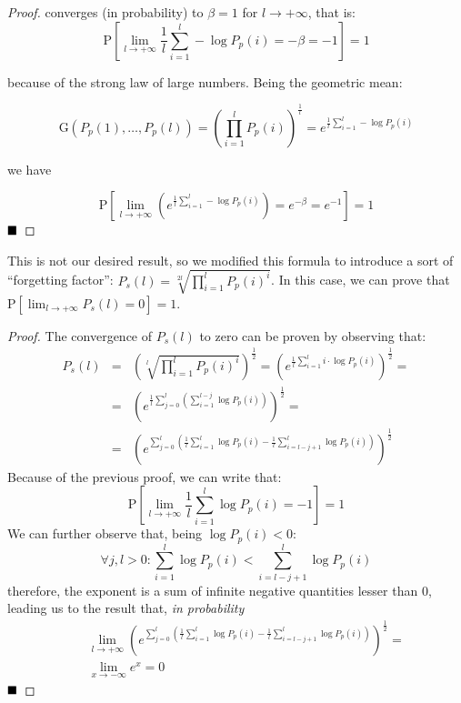 \begin{note}
\begin{proof}
  converges (in probability) to $\beta = 1$ for $l \to +\infty$, that is:
  \[
  \mathrm{P}\left[\lim_{l \to +\infty} \frac{1}{l}\sum_{i = 1}^{l} -\log P_{p}(i) = -\beta = -1 \right] = 1
  \]

  because of the strong law of large numbers. Being the geometric mean:

  \[
  \mathrm{G}(P_{p}(1), \ldots, P_{p}(l)) = \left(\prod_{i=1}^{l} P_{p}(i)\right)^{\frac{1}{l}} = e^{\frac{1}{l}\sum_{i = 1}^{l} -\log P_{p}(i)}
  \]

  we have

  \[
  \mathrm{P}\left[\lim_{l \to +\infty} \left( e^{\frac{1}{l}\sum_{i = 1}^{l} -\log P_{p}(i)} \right) = e^{-\beta} = e^{-1} \right] = 1
  \]
  \hfill$\qed$
\end{proof}

This is not our desired result, so we modified this formula to introduce a sort of ``forgetting factor'': $P_{s}(l) = \sqrt[2l]{\prod_{i = 1}^{l} P_{p}(i)^{i}}$. In this case, we can prove that $\mathrm{P}\left[\lim_{l \to +\infty} P_{s}(l) = 0\right] = 1$.

\begin{proof}
  The convergence of $P_{s}(l)$ to zero can be proven by observing that:
  \begin{eqnarray*}
    P_{s}(l) & = & \left(\sqrt[l]{\prod_{i = 1}^{l} P_{p}(i)^{i}}\right)^{\frac{1}{2}} = \left(e^{ \frac{1}{l} \sum_{i = 1}^{l} i \cdot \log P_{p}(i) }\right)^{\frac{1}{2}} =\\
    & = & \left(e^{ \frac{1}{l} \sum_{j = 0}^{l} \left( \sum_{i = 1}^{l-j} \log P_{p}(i) \right)}\right)^{\frac{1}{2}} =\\
    & = & \left(e^{ \sum_{j = 0}^{l} \left( \frac{1}{l} \sum_{i = 1}^{l} \log P_{p}(i) - \frac{1}{l} \sum_{i = l-j+1}^{l} \log P_{p}(i) \right)}\right)^{\frac{1}{2}}
  \end{eqnarray*}
  Because of the previous proof, we can write that:
  \[
  \mathrm{P}\left[\lim_{l \to +\infty} \frac{1}{l} \sum_{i = 1}^{l} \log P_{p}(i) = - 1 \right] = 1
  \]
  We can further observe that, being $\log P_{p}(i) < 0$:
  \[
  \forall j, l > 0: \sum_{i = 1}^{l} \log P_{p}(i) < \sum_{i = l-j+1}^{l} \log P_{p}(i)
  \]
  therefore, the exponent is a sum of infinite negative quantities lesser than $0$, leading us to the result that, \emph{in probability}
  \begin{eqnarray*}
    &&\lim_{l \to +\infty} \left(e^{ \sum_{j = 0}^{l} \left( \frac{1}{l} \sum_{i = 1}^{l} \log P_{p}(i) - \frac{1}{l} \sum_{i = l-j+1}^{l} \log P_{p}(i) \right) }\right)^{\frac{1}{2}} =\\
    &&\lim_{x \to -\infty} e^{x} = 0
  \end{eqnarray*}
  \hfill$\qed$
\end{proof}


\end{note}
